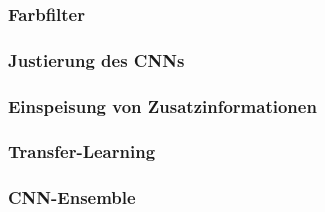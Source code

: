 \subsubsection{Farbfilter}

\subsubsection{Justierung des CNNs}

\subsubsection{Einspeisung von Zusatzinformationen}

\subsubsection{Transfer-Learning}

\subsubsection{CNN-Ensemble}